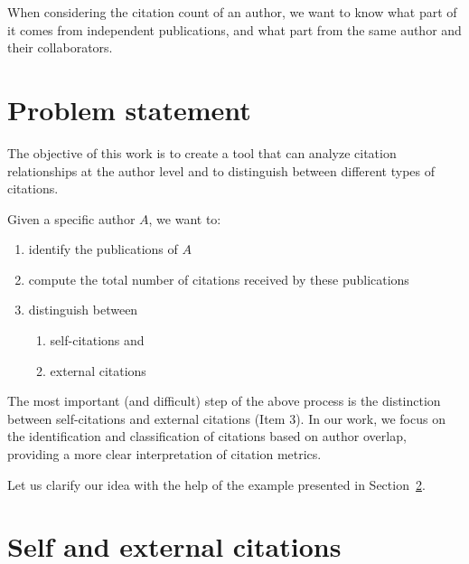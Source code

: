 When considering the citation count of an author, we want to know what part of it comes from independent publications, and what part from the same author and their collaborators.

\section{Problem statement} \label{sec:problem-statement}

The objective of this work is to create a tool that can analyze citation relationships at the author level and to distinguish between different types of citations.

Given a specific author $A$, we want to:

\begin{enumerate}
\item
identify the publications of $A$
\item
compute the total number of citations received by these publications
\item
distinguish between
    \begin{enumerate}
    \item self-citations and
    \item external citations
    \end{enumerate}
\end{enumerate}

The most important (and difficult) step of the above process is the distinction between self-citations and external citations (Item 3).
In our work, we focus on the identification and classification of citations based on author overlap, providing a more clear interpretation of citation metrics.

Let us clarify our idea with the help of the example presented in Section~\ref{sec:intro-example}.

\section{Self and external citations} \label{sec:intro-example}

%
%
%
%
%
%

